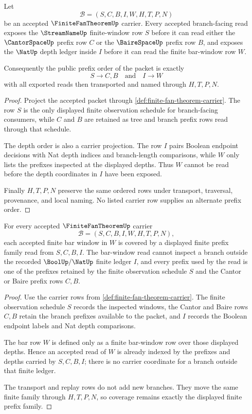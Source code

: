 \begin{theorem}
\label{thm:finite-fan-theorem-prefix-order-exactness}
Let
$$
\mathcal{B}=(S,C,B,I,W,H,T,P,N)
$$
be an accepted $\FiniteFanTheoremUp$ carrier. Every accepted branch-facing read exposes the $\StreamNameUp$ finite-window row $S$ before it can read either the $\CantorSpaceUp$ prefix row $C$ or the $\BaireSpaceUp$ prefix row $B$, and exposes the $\NatUp$ depth ledger inside $I$ before it can read the finite bar-window row $W$.

Consequently the public prefix order of the packet is exactly
$$
S \longrightarrow C,B \quad\text{and}\quad I \longrightarrow W
$$
with all exported reads then transported and named through $H,T,P,N$.
\end{theorem}
\begin{proof}
Project the accepted packet through \autoref{def:finite-fan-theorem-carrier}. The row $S$ is the only displayed finite observation schedule for branch-facing consumers, while $C$ and $B$ are retained as tree and branch prefix rows read through that schedule.

The depth order is also a carrier projection. The row $I$ pairs Boolean endpoint decisions with Nat depth indices and branch-length comparisons, while $W$ only lists the prefixes inspected at the displayed depths. Thus $W$ cannot be read before the depth coordinates in $I$ have been exposed.

Finally $H,T,P,N$ preserve the same ordered rows under transport, traversal, provenance, and local naming. No listed carrier row supplies an alternate prefix order.
\end{proof}

\begin{theorem}
\label{thm:finite-fan-theorem-bar-window-coverage}
For every accepted $\FiniteFanTheoremUp$ carrier
$$
\mathcal{B}=(S,C,B,I,W,H,T,P,N),
$$
each accepted finite bar window in $W$ is covered by a displayed finite prefix family read from $S,C,B,I$. The bar-window read cannot inspect a branch outside the recorded $\BoolUp/\NatUp$ finite ledger $I$, and every prefix used by the read is one of the prefixes retained by the finite observation schedule $S$ and the Cantor or Baire prefix rows $C,B$.
\end{theorem}
\begin{proof}
Use the carrier rows from \autoref{def:finite-fan-theorem-carrier}. The finite observation schedule $S$ records the inspected windows, the Cantor and Baire rows $C,B$ retain the branch prefixes available to the packet, and $I$ records the Boolean endpoint labels and Nat depth comparisons.

The bar row $W$ is defined only as a finite bar-window row over those displayed depths. Hence an accepted read of $W$ is already indexed by the prefixes and depths carried by $S,C,B,I$; there is no carrier coordinate for a branch outside that finite ledger.

The transport and replay rows do not add new branches. They move the same finite family through $H,T,P,N$, so coverage remains exactly the displayed finite prefix family.
\end{proof}

